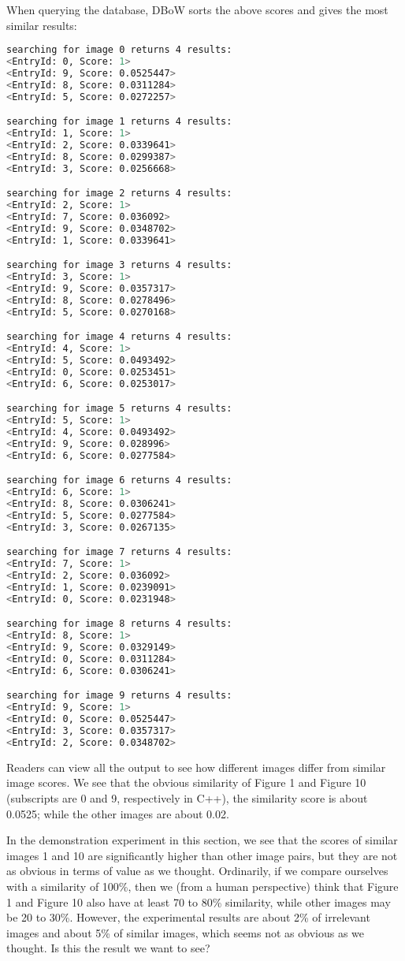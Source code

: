 When querying the database, DBoW sorts the above scores and gives the most similar results:
\begin{lstlisting}[language=sh,caption=Terminal output:]
searching for image 0 returns 4 results:
<EntryId: 0, Score: 1>
<EntryId: 9, Score: 0.0525447>
<EntryId: 8, Score: 0.0311284>
<EntryId: 5, Score: 0.0272257>

searching for image 1 returns 4 results:
<EntryId: 1, Score: 1>
<EntryId: 2, Score: 0.0339641>
<EntryId: 8, Score: 0.0299387>
<EntryId: 3, Score: 0.0256668>

searching for image 2 returns 4 results:
<EntryId: 2, Score: 1>
<EntryId: 7, Score: 0.036092>
<EntryId: 9, Score: 0.0348702>
<EntryId: 1, Score: 0.0339641>

searching for image 3 returns 4 results:
<EntryId: 3, Score: 1>
<EntryId: 9, Score: 0.0357317>
<EntryId: 8, Score: 0.0278496>
<EntryId: 5, Score: 0.0270168>

searching for image 4 returns 4 results:
<EntryId: 4, Score: 1>
<EntryId: 5, Score: 0.0493492>
<EntryId: 0, Score: 0.0253451>
<EntryId: 6, Score: 0.0253017>

searching for image 5 returns 4 results:
<EntryId: 5, Score: 1>
<EntryId: 4, Score: 0.0493492>
<EntryId: 9, Score: 0.028996>
<EntryId: 6, Score: 0.0277584>

searching for image 6 returns 4 results:
<EntryId: 6, Score: 1>
<EntryId: 8, Score: 0.0306241>
<EntryId: 5, Score: 0.0277584>
<EntryId: 3, Score: 0.0267135>

searching for image 7 returns 4 results:
<EntryId: 7, Score: 1>
<EntryId: 2, Score: 0.036092>
<EntryId: 1, Score: 0.0239091>
<EntryId: 0, Score: 0.0231948>

searching for image 8 returns 4 results:
<EntryId: 8, Score: 1>
<EntryId: 9, Score: 0.0329149>
<EntryId: 0, Score: 0.0311284>
<EntryId: 6, Score: 0.0306241>

searching for image 9 returns 4 results:
<EntryId: 9, Score: 1>
<EntryId: 0, Score: 0.0525447>
<EntryId: 3, Score: 0.0357317>
<EntryId: 2, Score: 0.0348702>
\end{lstlisting}

Readers can view all the output to see how different images differ from similar image scores. We see that the obvious similarity of Figure 1 and Figure 10 (subscripts are 0 and 9, respectively in C++), the similarity score is about 0.0525; while the other images are about 0.02.

In the demonstration experiment in this section, we see that the scores of similar images 1 and 10 are significantly higher than other image pairs, but they are not as obvious in terms of value as we thought. Ordinarily, if we compare ourselves with a similarity of 100\%, then we (from a human perspective) think that Figure 1 and Figure 10 also have at least 70 to 80\% similarity, while other images may be 20 to 30\%. However, the experimental results are about 2\% of irrelevant images and about 5\% of similar images, which seems not as obvious as we thought. Is this the result we want to see?

